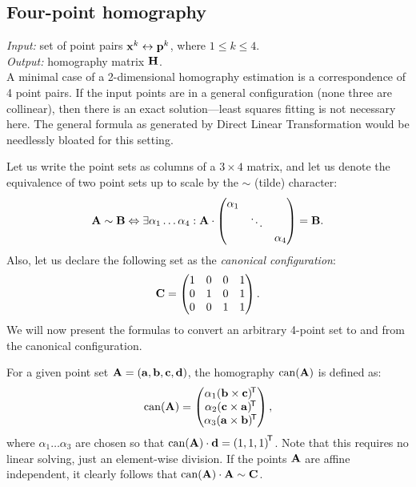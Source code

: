 
\subsection{Four-point homography}

\textit{Input:} set of point pairs $\mathbf{x}^k \leftrightarrow \mathbf{p}^k$, where $1 \leq k \leq 4$.\\
\textit{Output:} homography matrix $\mathbf{H}$.\\

A minimal case of a 2-dimensional homography estimation is a correspondence of 4 point pairs.
If the input points are in a general configuration (none three are collinear), then there is an exact solution---least squares fitting is not necessary here.
The general formula as generated by Direct Linear Transformation would be needlessly bloated for this setting.


Let us write the point sets as columns of a $3 \times 4$ matrix, and let us denote the equivalence of two point sets up to scale by the $\sim$ (tilde) character:
$$\mathbf{A} \sim \mathbf{B} \Leftrightarrow \exists \alpha_1 \dots \alpha_4 : \mathbf{A} \cdot \begin{pmatrix}
 \alpha_1 & & \\
  & \ddots & \\
 & & \alpha_4
 \end{pmatrix} = \mathbf{B}.$$
Also, let us declare the following set as the \textit{canonical configuration}:
$$\mathbf{C} = \begin{pmatrix}
 1 & 0 & 0 & 1 \\
 0 & 1 & 0 & 1 \\
 0 & 0 & 1 & 1
 \end{pmatrix}.$$
We will now present the formulas to convert an arbitrary 4-point set to and from the canonical configuration.

For a given point set $\mathbf{A} = \left( \mathbf{a}, \mathbf{b}, \mathbf{c}, \mathbf{d} \right)$, the homography $\mathrm{can}(\mathbf{A})$ is defined as:
$$\mathrm{can}(\mathbf{A}) = \begin{pmatrix}
 \alpha_1 (\mathbf{b} \times \mathbf{c}) ^{\!\mathsf{T}} \\
 \alpha_2 (\mathbf{c} \times \mathbf{a}) ^{\!\mathsf{T}} \\
 \alpha_3 (\mathbf{a} \times \mathbf{b}) ^{\!\mathsf{T}} \\
 \end{pmatrix},
$$
where $\alpha_1 \dots \alpha_3$ are chosen so that $\mathrm{can}(\mathbf{A}) \cdot \mathbf{d} = \left( 1, 1, 1 \right)^{\!\mathsf{T}}$.
Note that this requires no linear solving, just an element-wise division.
If the points $\mathbf{A}$ are affine independent, it clearly follows that $\mathrm{can}(\mathbf{A}) \cdot \mathbf{A} \sim \mathbf{C}$.

